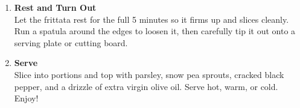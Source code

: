 \begin{enumerate}
      \item \textbf{Rest and Turn Out} \\
            Let the frittata rest for the full 5 minutes so it firms up and slices cleanly. Run a spatula around the edges to loosen it, then carefully tip it out onto a serving plate or cutting board.

      \item \textbf{Serve} \\
            Slice into portions and top with parsley, snow pea sprouts, cracked black pepper, and a drizzle of extra virgin olive oil. Serve hot, warm, or cold. Enjoy!

\end{enumerate}



